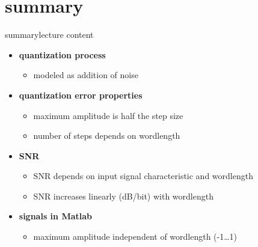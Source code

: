     \section{summary}
        \begin{frame}{summary}{lecture content}
            \begin{itemize}
                \item  \textbf{quantization process}
                    \begin{itemize}
                        \item   modeled as addition of noise
                    \end{itemize}
                \bigskip
                \item      \textbf{quantization error properties}
                    \begin{itemize}
                        \item   maximum amplitude is half the step size
                        \item   number of steps depends on wordlength
                    \end{itemize}
                \bigskip
                \item      \textbf{SNR}
                    \begin{itemize}
                        \item   SNR depends on input signal characteristic and wordlength
                        \item   SNR increases linearly (\unit[6]{dB}/bit) with wordlength
                    \end{itemize}
                \bigskip
                \item      \textbf{signals in Matlab}
                    \begin{itemize}
                        \item   maximum amplitude independent of wordlength (-1\ldots 1)
                    \end{itemize}
            \end{itemize}
        \end{frame}

